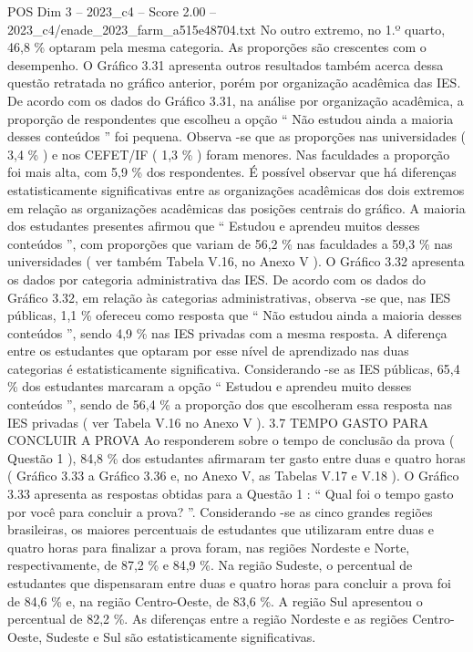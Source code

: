 \begin{textsample}{POS Dim 3 – 2023\_c4 – Score 2.00 – 2023\_c4/enade\_2023\_farm\_a515e48704.txt}
No outro extremo, no 1.º quarto, 46,8 \% optaram pela mesma categoria.
As proporções são crescentes com o desempenho.
O Gráfico 3.31 apresenta outros resultados também acerca dessa questão retratada no gráfico anterior, porém por organização acadêmica das IES.
De acordo com os dados do Gráfico 3.31, na análise por organização acadêmica, a proporção de respondentes que escolheu a opção “ Não estudou ainda a maioria desses conteúdos ” foi pequena.
Observa -se que as proporções nas universidades ( 3,4 \% ) e nos CEFET/IF ( 1,3 \% ) foram menores.
Nas faculdades a proporção foi mais alta, com 5,9 \% dos respondentes.
É possível observar que há diferenças estatisticamente significativas entre as organizações acadêmicas dos dois extremos em relação as organizações acadêmicas das posições centrais do gráfico.
A maioria dos estudantes presentes afirmou que “ Estudou e aprendeu muitos desses conteúdos ”, com proporções que variam de 56,2 \% nas faculdades a 59,3 \% nas universidades ( ver também Tabela V.16, no Anexo V ).
O Gráfico 3.32 apresenta os dados por categoria administrativa das IES.
De acordo com os dados do Gráfico 3.32, em relação às categorias administrativas, observa -se que, nas IES públicas, 1,1 \% ofereceu como resposta que “ Não estudou ainda a maioria desses conteúdos ”, sendo 4,9 \% nas IES privadas com a mesma resposta.
A diferença entre os estudantes que optaram por esse nível de aprendizado nas duas categorias é estatisticamente significativa.
Considerando -se as IES públicas, 65,4 \% dos estudantes marcaram a opção “ Estudou e aprendeu muito desses conteúdos ”, sendo de 56,4 \% a proporção dos que escolheram essa resposta nas IES privadas ( ver Tabela V.16 no Anexo V ). 3.7 TEMPO GASTO PARA CONCLUIR A PROVA Ao responderem sobre o tempo de conclusão da prova ( Questão 1 ), 84,8 \% dos estudantes afirmaram ter gasto entre duas e quatro horas ( Gráfico 3.33 a Gráfico 3.36 e, no Anexo V, as Tabelas V.17 e V.18 ).
O Gráfico 3.33 apresenta as respostas obtidas para a Questão 1 : “ Qual foi o tempo gasto por você para concluir a prova? ”.
Considerando -se as cinco grandes regiões brasileiras, os maiores percentuais de estudantes que utilizaram entre duas e quatro horas para finalizar a prova foram, nas regiões Nordeste e Norte, respectivamente, de 87,2 \% e 84,9 \%.
Na região Sudeste, o percentual de estudantes que dispensaram entre duas e quatro horas para concluir a prova foi de 84,6 \% e, na região Centro-Oeste, de 83,6 \%.
A região Sul apresentou o percentual de 82,2 \%.
As diferenças entre a região Nordeste e as regiões Centro-Oeste, Sudeste e Sul são estatisticamente significativas.

\end{textsample}
